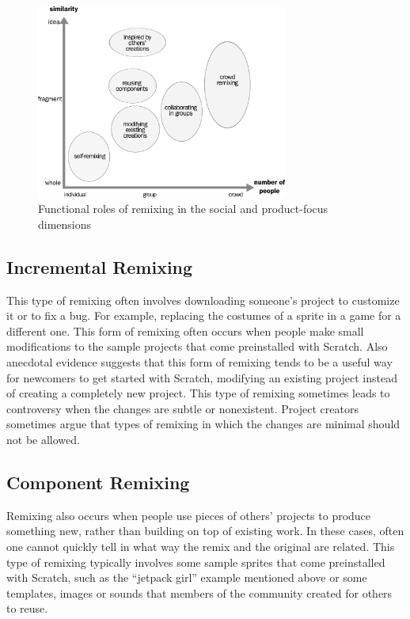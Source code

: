 \begin{figure}
\centering
\includegraphics[width=3.25in]{figures/function.pdf}
\caption{Functional roles of remixing in the social and product-focus dimensions}
\label{fig:function}
\end{figure}

\subsection{Incremental Remixing}
This type of remixing often involves downloading someone's project to customize it or to fix a bug. 
For example, replacing the costumes of a sprite in a game for a different one. 
This form of remixing often occurs when people make small modifications to the sample projects that come preinstalled with Scratch.
Also anecdotal evidence suggests that this form of remixing tends to be a useful way for newcomers to get started with Scratch,  modifying an existing project instead of creating a completely new project.
This type of remixing sometimes leads to controversy when the changes are subtle or nonexistent.
Project creators sometimes argue that types of remixing in which the changes are minimal should not be allowed.

\subsection{Component Remixing}
Remixing also occurs when people use pieces of others' projects to produce something new, rather than building on top of existing work.   
In these cases, often one cannot quickly tell in what way the remix and the original are related.
This type of remixing typically involves some sample sprites that come preinstalled with Scratch, such as the ``jetpack girl'' example mentioned above or some templates, images or sounds that members of the community created for others to reuse.


